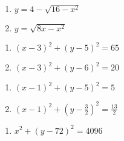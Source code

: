 \begin{multicols}{2}
\begin{enumerate}
\setcounter{enumi}{\value{HW}}

\item  $y = 4-\sqrt{16-x^2}$

\item $y = \sqrt{8x-x^2}$

\setcounter{HW}{\value{enumi}}
\end{enumerate}
\end{multicols}




\begin{multicols}{2}
\begin{enumerate}
\setcounter{enumi}{\value{HW}}

\item $(x - 3)^{2} + (y - 5)^{2} = 65$

\item  $(x-3)^2+(y-6)^2 = 20$

\setcounter{HW}{\value{enumi}}
\end{enumerate}
\end{multicols}

\begin{multicols}{2}
\begin{enumerate}
\setcounter{enumi}{\value{HW}}

\item  $(x-1)^2 + (y-5)^2 = 5$

\item $(x-1)^2 + \left(y - \frac{3}{2}\right)^2 = \frac{13}{2}$

\setcounter{HW}{\value{enumi}}
\end{enumerate}
\end{multicols}

\begin{enumerate}
\setcounter{enumi}{\value{HW}}

\item $x^{2} + (y - 72)^{2} = 4096$

\end{enumerate}